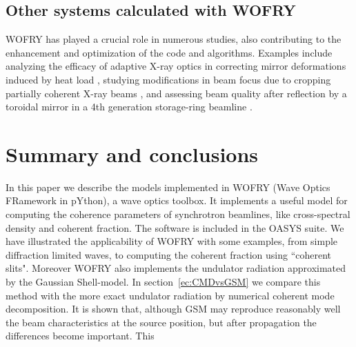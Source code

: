 \documentclass{iopconfser}
\newcommand{\todo}[1]{{\color{red}[TODO: "#1'']}}
\begin{document}



\subsection{Other systems calculated with WOFRY}

WOFRY has played a crucial role in numerous studies, also contributing to the enhancement and optimization of the code and algorithms. Examples include analyzing the efficacy of adaptive X-ray optics in correcting mirror deformations induced by heat load \cite{SanchezdelRio2020}, studying modifications in beam focus due to cropping partially coherent X-ray beams \cite{SanchezdelRio2022EPL}, and assessing beam quality after reflection by a toroidal mirror in a 4th generation storage-ring beamline \cite{ReyesHerrera2023}.

\section{Summary and conclusions}
\label{sec:summary}
In this paper we describe the models implemented in WOFRY (Wave Optics FRamework in pYthon), a wave optics toolbox. It implements a useful model for computing the coherence parameters of synchrotron beamlines, like cross-spectral density and coherent fraction. The software is included in the OASYS\cite{OASYS} suite. We have illustrated the applicability of WOFRY with some examples, from simple diffraction limited waves, to computing the coherent fraction using ``coherent slits". Moreover WOFRY also implements the undulator radiation approximated by the Gaussian Shell-model. In section~\ref{ec:CMDvsGSM} we compare this method with the more exact undulator radiation by numerical coherent mode decomposition. It is shown that, although GSM may reproduce reasonably well the beam characteristics at the source position, but after propagation the differences become important. This 









% 


\end{document}
